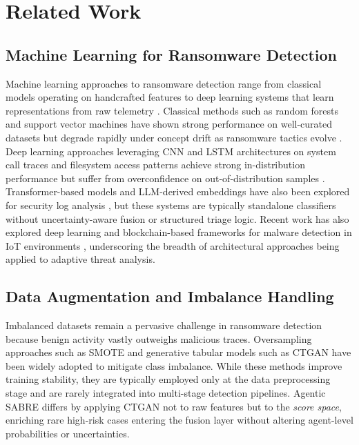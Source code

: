 \section{Related Work}
\label{sec:eswa_related}

\subsection{Machine Learning for Ransomware Detection}

Machine learning approaches to ransomware detection range from classical models operating on handcrafted features to deep learning systems that learn representations from raw telemetry \cite{razaulla2023age, fernando2020study}. Classical methods such as random forests and support vector machines have shown strong performance on well-curated datasets but degrade rapidly under concept drift as ransomware tactics evolve \cite{Fernando2024FeSAD, Ceschin2022ConceptDrift}. Deep learning approaches leveraging CNN and LSTM architectures on system call traces and filesystem access patterns achieve strong in-distribution performance but suffer from overconfidence on out-of-distribution samples \cite{zahoora2022Deep}. Transformer-based models and LLM-derived embeddings have also been explored for security log analysis \cite{tian2025llmsurvey, ZhangLZYHY25}, but these systems are typically standalone classifiers without uncertainty-aware fusion or structured triage logic. Recent work has also explored deep learning and blockchain-based frameworks for malware detection in IoT environments \cite{pawar2024securing}, underscoring the breadth of architectural approaches being applied to adaptive threat analysis.

\subsection{Data Augmentation and Imbalance Handling}

Imbalanced datasets remain a pervasive challenge in ransomware detection because benign activity vastly outweighs malicious traces. Oversampling approaches such as SMOTE \cite{chawla2002smote} and generative tabular models such as CTGAN \cite{xu2019ctgan, ashrapov2020tabular} have been widely adopted to mitigate class imbalance. While these methods improve training stability, they are typically employed only at the data preprocessing stage and are rarely integrated into multi-stage detection pipelines. Agentic SABRE differs by applying CTGAN not to raw features but to the \emph{score space}, enriching rare high-risk cases entering the fusion layer without altering agent-level probabilities or uncertainties.

